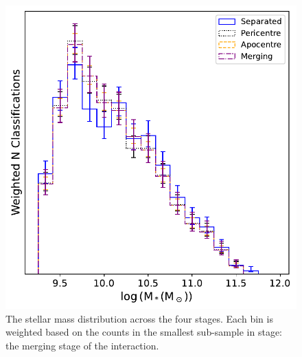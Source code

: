 \begin{figure}
\centering
\includegraphics[width = \textwidth]{Chapter3/figures/stellar-mass-dist.pdf}
\caption[The stellar mass distribution across the four stages.]{The stellar mass distribution across the four stages. Each bin is weighted based on the counts in the smallest sub-sample in stage: the merging stage of the interaction.}
\label{fig:weighted-mass}
\end{figure}

